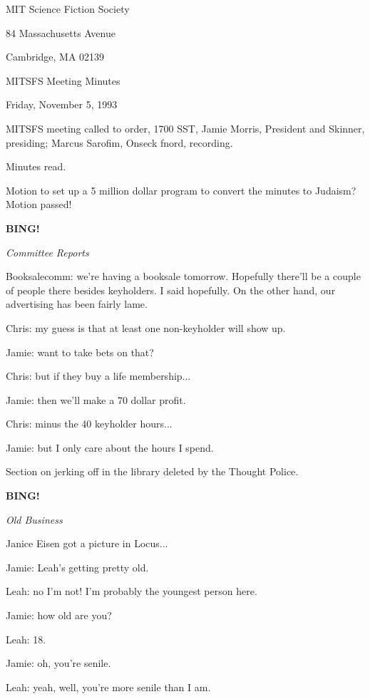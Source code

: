 \documentclass[12pt]{article}
\newcommand{\bing}{{\bf BING!} }
\newcommand{\goto}[1]{\bing \vskip 12pt \centerline{{\em{#1}}}}
\begin{document}
\begin{center}

MIT Science Fiction Society 

84 Massachusetts Avenue

Cambridge, MA 02139

\vspace{12pt}

MITSFS Meeting Minutes 

Friday, November 5, 1993

\end{center}
 
\vspace{18pt}

\setlength{\parskip}{6pt}

\noindent
MITSFS meeting called to order, 1700 SST,
Jamie Morris, President and Skinner, presiding; Marcus Sarofim, Onseck fnord, recording.

Minutes read.

Motion to set up a 5 million dollar program to convert the minutes to Judaism? Motion passed!

\goto{Committee Reports}

Booksalecomm: we're having a booksale tomorrow. Hopefully there'll be a couple of people there besides keyholders. I said hopefully. On the other hand, our advertising has been fairly lame.

Chris: my guess is that at least one non-keyholder will show up.

Jamie: want to take bets on that?

Chris: but if they buy a life membership...

Jamie: then we'll make a 70 dollar profit.

Chris: minus the 40 keyholder hours...

Jamie: but I only care about the hours I spend.

Section on jerking off in the library deleted by the Thought Police.

\goto{Old Business}

Janice Eisen got a picture in Locus...

Jamie: Leah's getting pretty old.

Leah: no I'm not! I'm probably the youngest person here.

Jamie: how old are you?

Leah: 18.

Jamie: oh, you're senile.

Leah: yeah, well, you're more senile than I am.
\end{document}
